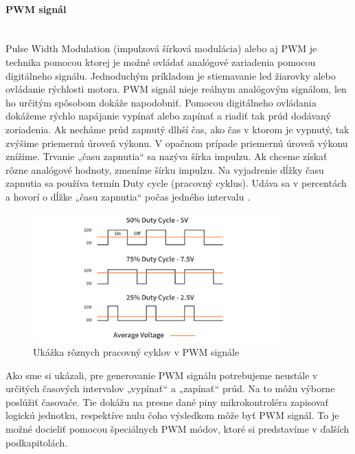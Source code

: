 \paragraph{PWM signál} \mbox{}\\
Pulse Width Modulation (impulzová šírková modulácia) alebo aj PWM je technika pomocou ktorej je možné ovládať analógové zariadenia pomocou digitálneho signálu.
Jednoduchým príkladom je stiemavanie led žiarovky alebo ovládanie rýchlosti motora. PWM signál nieje reálnym analógovým signálom, len ho určitým spôsobom dokáže napodobniť.
Pomocou digitálneho ovládania dokážeme rýchlo napájanie vypínať alebo zapínať a riadiť tak prúd dodávaný zoriadenia. Ak necháme prúd zapnutý dlhší čas, ako čas v ktorom
je vypnutý, tak zvýšime priemernú úroveň výkonu. V opačnom prípade priemernú úroveň výkonu znížime. Trvanie „času zapnutia“ sa nazýva šírka impulzu.
Ak chceme získať rôzne analógové hodnoty, zmeníme šírku impulzu. Na vyjadrenie dĺžky času zapnutia sa používa termín Duty cycle (pracovný cyklus). Udáva sa v percentách
a hovorí o dĺžke „času zapnutia“  počas jedného intervalu \cite{WhatPWMSignal}.
\begin{figure}[!h]
    \centering
    \includegraphics[width=0.85\textwidth]{img/duty-cycle.jpg}
    \caption{Ukážka rôznych pracovný cyklov v PWM signále}
    \label{figure:pwm-signal}
\end{figure}

Ako sme si ukázali, pre generovanie PWM signálu potrebujeme neustále v určitých časových intervalov „vypínať“ a „zapínať“ prúd. Na to môžu výborne poslúžiť časovače.
Tie dokážu na presne dané piny mikrokontroléra zapisovať logickú jednotku, respektíve nulu čoho výsledkom môže byť PWM signál. To je možné docieliť
pomocou špeciálnych PWM módov, ktoré si predstavíme v ďalších podkapitolách.

